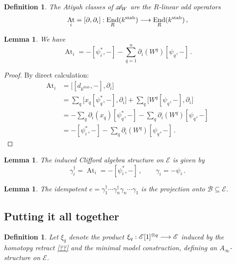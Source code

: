 \documentclass[english,letter paper,12pt,leqno]{article}
\newtheorem{lemma}[theorem]{Lemma}
\theoremstyle{example}
\newtheorem{definition}[theorem]{Definition}
\numberwithin{equation}{section}
\def\stab{\operatorname{stab}}
\DeclareMathOperator{\End}{End}
\DeclareMathOperator{\At}{At}
\begin{document}
\begin{definition}
The Atiyah classes of $\mathscr{A}_W$ are the $R$-linear odd operators
\[
\At_i = [\partial, \partial_{i}]: \End_R(k^{\stab}) \lto \End_R(k^{\stab})\,,
\]
\end{definition}

\begin{lemma} We have
\[
\At_i = -[\psi_i^*, -] - \sum_{q=1}^n \partial_{i}(W^q) [ \psi_q, - ]\,.
\]
\end{lemma}
\begin{proof}
By direct calculation:
\begin{align*}
\At_i &= \big[ [d_{k^{\stab}},-], \partial_{i} \big]\\
&= \sum_q \big[x_q [\psi_q^*,-], \partial_{i}\big] + \sum_q \big[W^q [\psi_q,-], \partial_{i}\big]\\
&= -\sum_q \partial_{i}(x_q) [\psi_q^*,-] - \sum_q \partial_{i}(W^q) [\psi_q,-]\\
&= -[\psi_i^*,-] - \sum_q \partial_{i}(W^q) [\psi_q, -]\,.
\end{align*}
\end{proof}

\begin{lemma} The induced Clifford algebra structure on $\mathscr{E}$ is given by
\[
\gamma_i^\dagger = \At_i = -[\psi_i^*, -]\,, \qquad \gamma_i = -\psi_i\,.
\]
\end{lemma}

\begin{lemma} The idempotent $e = \gamma_1^\dagger \cdots \gamma_n^\dagger \gamma_n \cdots \gamma_1$ is the projection onto $\mathscr{B} \subseteq \mathscr{E}$.
\end{lemma}


\subsection{Putting it all together}


\begin{definition} Let $\xi_q$ denote the product $\xi_q: \mathscr{E}[1]^{\otimes q} \longrightarrow \mathscr{E}$ induced by the homotopy retract \eqref{??} and the minimal model construction, defining an $A_\infty$-structure on $\mathscr{E}$. 
\end{definition}
\end{document}
